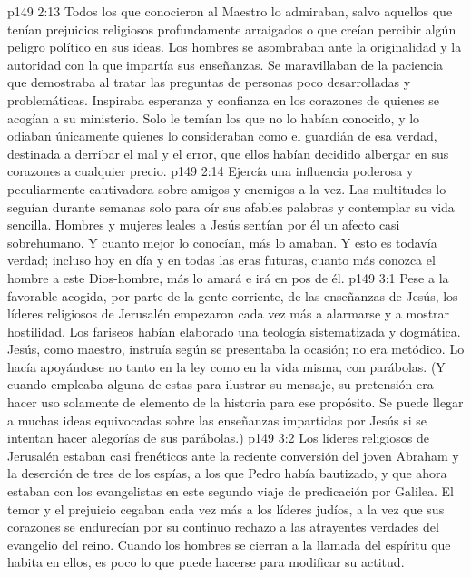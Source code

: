 \vs p149 2:13 Todos los que conocieron al Maestro lo admiraban, salvo aquellos que tenían prejuicios religiosos profundamente arraigados o que creían percibir algún peligro político en sus ideas. Los hombres se asombraban ante la originalidad y la autoridad con la que impartía sus enseñanzas. Se maravillaban de la paciencia que demostraba al tratar las preguntas de personas poco desarrolladas y problemáticas. Inspiraba esperanza y confianza en los corazones de quienes se acogían a su ministerio. Solo le temían los que no lo habían conocido, y lo odiaban únicamente quienes lo consideraban como el guardián de esa verdad, destinada a derribar el mal y el error, que ellos habían decidido albergar en sus corazones a cualquier precio.
\vs p149 2:14 Ejercía una influencia poderosa y peculiarmente cautivadora sobre amigos y enemigos a la vez. Las multitudes lo seguían durante semanas solo para oír sus afables palabras y contemplar su vida sencilla. Hombres y mujeres leales a Jesús sentían por él un afecto casi sobrehumano. Y cuanto mejor lo conocían, más lo amaban. Y esto es todavía verdad; incluso hoy en día y en todas las eras futuras, cuanto más conozca el hombre a este Dios\hyp{}hombre, más lo amará e irá en pos de él.
\vs p149 3:1 Pese a la favorable acogida, por parte de la gente corriente, de las enseñanzas de Jesús, los líderes religiosos de Jerusalén empezaron cada vez más a alarmarse y a mostrar hostilidad. Los fariseos habían elaborado una teología sistematizada y dogmática. Jesús, como maestro, instruía según se presentaba la ocasión; no era metódico. Lo hacía apoyándose no tanto en la ley como en la vida misma, con parábolas. (Y cuando empleaba alguna de estas para ilustrar su mensaje, su pretensión era hacer uso solamente de  elemento de la historia para ese propósito. Se puede llegar a muchas ideas equivocadas sobre las enseñanzas impartidas por Jesús si se intentan hacer alegorías de sus parábolas.)
\vs p149 3:2 Los líderes religiosos de Jerusalén estaban casi frenéticos ante la reciente conversión del joven Abraham y la deserción de tres de los espías, a los que Pedro había bautizado, y que ahora estaban con los evangelistas en este segundo viaje de predicación por Galilea. El temor y el prejuicio cegaban cada vez más a los líderes judíos, a la vez que sus corazones se endurecían por su continuo rechazo a las atrayentes verdades del evangelio del reino. Cuando los hombres se cierran a la llamada del espíritu que habita en ellos, es poco lo que puede hacerse para modificar su actitud.
